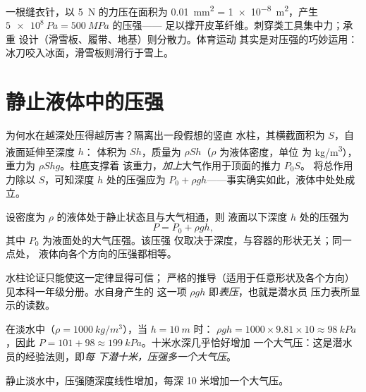 \begin{remark}[集中还是分散]\label{rem:g10:pressure:tools}
一根缝衣针，以 \qty{5}{N} 的力压在面积为 \qty{0.01}{mm^2} =
\qty{1e-8}{m^2}，产生 $\qty{5e8}{Pa} = \qty{500}{MPa}$ 的压强——
足以撑开皮革纤维。刺穿类工具集中力；承重
设计（滑雪板、履带、地基）则分散力。体育运动
其实是对压强的巧妙运用：冰刀咬入冰面，滑雪板则滑行于雪上。
\end{remark}

\section{静止液体中的压强}

为何水在越深处压得越厉害？隔离出一段假想的竖直
水柱，其横截面积为 $S$，自液面延伸至深度 $h$：
体积为 $Sh$，质量为 $\rho S h$（$\rho$ 为液体密度，单位
为 \unit{kg/m^3}），重力为 $\rho S h g$。柱底支撑着
该重力，\emph{加上}大气作用于顶面的推力 $P_0 S$。
将总作用力除以 $S$，可知深度 $h$ 处的压强应为
$P_0 + \rho g h$——事实确实如此，液体中处处成立。

\begin{theorem}[深度处的压强]\label{thm:g10:pressure:depth}
设密度为 $\rho$ 的液体处于静止状态且与大气相通，则
液面以下深度 $h$ 处的压强为
\[
P = P_0 + \rho g h,
\]
其中 $P_0$ 为液面处的大气压强。该压强
仅取决于深度，与容器的形状无关；同一点处，
液体向各个方向的压强都相等。
\end{theorem}
\admitted

\begin{remark}
水柱论证只能使这一定律显得可信；
严格的推导（适用于任意形状及各个方向）见本科一年级分册。水自身产生的
这一项 $\rho g h$ 即\emph{表压}，也就是潜水员
压力表所显示的读数。
\end{remark}

\begin{example}[十米水深]\label{ex:g10:pressure:tenmetres}
在淡水中（$\rho = \qty{1000}{kg/m^3}$），当 $h = \qty{10}{m}$ 时：
$\rho g h = 1000 \times 9.81 \times 10 \approx \qty{98}{kPa}$，因此
$P = 101 + 98 \approx \qty{199}{kPa}$。十米水深几乎恰好增加
一个大气压：这是潜水员的经验法则，即\emph{每
下潜十米，压强多一个大气压}。
\end{example}

\begin{omfigure}

{\small 静止淡水中，压强随深度线性增加，每深 10 米增加一个大气压。}
\end{omfigure}

